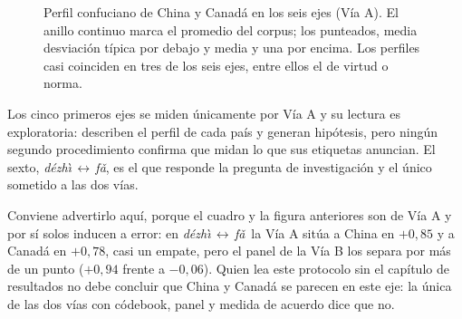 \documentclass[12pt,letterpaper]{article}
\newcommand{\dezhi}{\textit{d\'ezh\`{\i}}}
\newcommand{\fa}{\textit{f\v{a}}}
\newcommand{\ejedf}{\dezhi\,$\leftrightarrow$\,\fa}
\begin{document}
\begin{figure}[htbp]
\centering
{}
\caption{Perfil confuciano de China y Canadá en los seis ejes (Vía A). El anillo continuo marca el promedio del corpus; los punteados, media desviación típica por debajo y media y una por encima. Los perfiles casi coinciden en tres de los seis ejes, entre ellos el de virtud o norma.}
\label{fig:radar}
\end{figure}

Los cinco primeros ejes se miden únicamente por Vía A y su lectura es exploratoria: describen el perfil de cada país y generan hipótesis, pero ningún segundo procedimiento confirma que midan lo que sus etiquetas anuncian. El sexto, \ejedf, es el que responde la pregunta de investigación y el único sometido a las dos vías.

Conviene advertirlo aquí, porque el cuadro y la figura anteriores son de Vía A y por sí solos inducen a error: en \ejedf\ la Vía A sitúa a China en $+0{,}85$ y a Canadá en $+0{,}78$, casi un empate, pero el panel de la Vía B los separa por más de un punto ($+0{,}94$ frente a $-0{,}06$). Quien lea este protocolo sin el capítulo de resultados no debe concluir que China y Canadá se parecen en este eje: la única de las dos vías con códebook, panel y medida de acuerdo dice que no.
\end{document}
